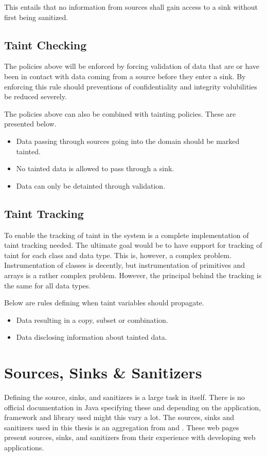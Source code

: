 This entails that no information from sources shall gain access to a sink without first being sanitized.



\subsection{Taint Checking}
The policies above will be enforced by forcing validation of data that are or have been in contact with data coming from a source before they enter a sink. By enforcing this rule should preventions of confidentiality and integrity volubilities be reduced severely.

The policies above can also be combined with tainting policies. These are presented below.

\hfill
\begin{itemize}
    \item Data passing through sources going into the domain should be marked tainted.
    \item No tainted data is allowed to pass through a sink.
    \item Data can only be detainted through validation.
\end{itemize}
\hfill



\subsection{Taint Tracking}
To enable the tracking of taint in the system is a complete implementation of taint tracking needed. The ultimate goal would be to have support for tracking of taint for each class and data type. This is, however, a complex problem. Instrumentation of classes is decently, but instrumentation of primitives and arrays is a rather complex problem. However, the principal behind the tracking is the same for all data types. 

Below are rules defining when taint variables should propagate.

\hfill
\begin{itemize}
    \item Data resulting in a copy, subset or combination.
    \item Data disclosing information about tainted data.
\end{itemize}
\hfill



\section{Sources, Sinks \& Sanitizers}
Defining the source, sinks, and sanitizers is a large task in itself. There is no official documentation in Java specifying these and depending on the application, framework and library used might this vary a lot.  The sources, sinks and sanitizers used in this thesis is an aggregation from \textcite{sssCodeMaster} and \textcite{sssOWASP}. These web pages present sources, sinks, and sanitizers from their experience with developing web applications. 



